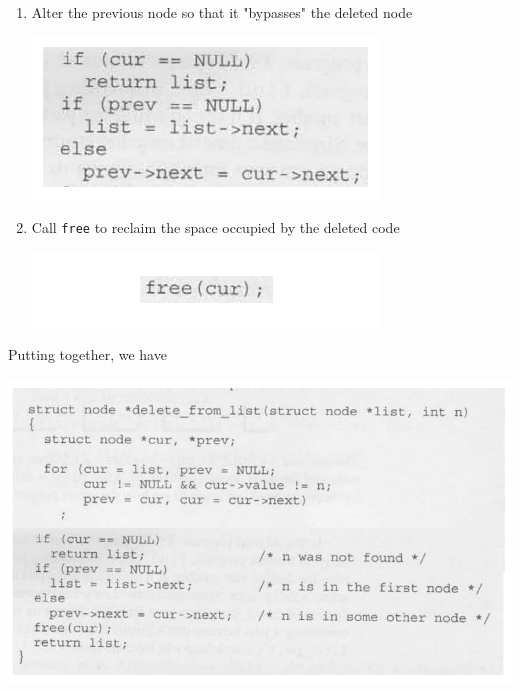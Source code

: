 \documentclass[12pt]{article}
\begin{document}
\begin{enumerate}[1.]
\begin{itemize}
\begin{itemize}
\begin{enumerate}[1.]
                \item Alter the previous node so that it "bypasses" the deleted node

                \begin{center}
                \includegraphics[width=0.6\linewidth]{images/review_8_solution_5.png}
                \end{center}

                \item Call \texttt{free} to reclaim the space occupied by the deleted code

                \begin{center}
                \includegraphics[width=0.6\linewidth]{images/review_8_solution_6.png}
                \end{center}
            \end{enumerate}

            \bigskip

            Putting together, we have

            \begin{center}
            \includegraphics[width=\linewidth]{images/review_8_solution_7.png}
            \end{center}
        \end{itemize}
    \end{itemize}


\end{enumerate}
\end{document}
